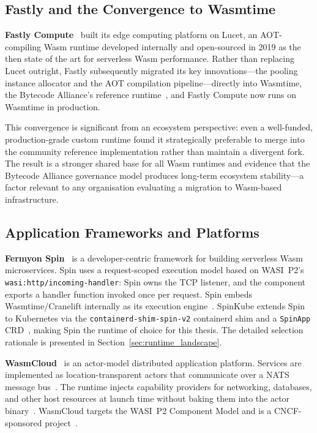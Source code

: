 \subsection{Fastly and the Convergence to Wasmtime}

\textbf{Fastly Compute}~\cite{fastly2024compute} built its edge computing platform on Lucet, an \acs{AOT}-compiling \acs{Wasm} runtime developed internally and open-sourced in 2019 as the then state of the art for serverless \acs{Wasm} performance. Rather than replacing Lucet outright, Fastly subsequently migrated its key innovations---the pooling instance allocator and the \acs{AOT} compilation pipeline---directly into Wasmtime, the Bytecode Alliance's reference runtime~\cite{fastly2020lucetwasm}, and Fastly Compute now runs on Wasmtime in production.

This convergence is significant from an ecosystem perspective: even a well-funded, production-grade custom runtime found it strategically preferable to merge into the community reference implementation rather than maintain a divergent fork. The result is a stronger shared base for all \acs{Wasm} runtimes and evidence that the Bytecode Alliance governance model produces long-term ecosystem stability---a factor relevant to any organisation evaluating a migration to \acs{Wasm}-based infrastructure.

\subsection{Application Frameworks and Platforms}

\begin{sloppypar}
\textbf{Fermyon Spin}~\cite{fermyon2024spin} is a developer-centric framework for building serverless \acs{Wasm} microservices. Spin uses a request-scoped execution model based on \acs{WASI}~P2's \texttt{wasi:http/incoming-handler}: Spin owns the TCP listener, and the component exports a handler function invoked once per request. Spin embeds Wasmtime/Cranelift internally as its execution engine~\cite{fermyon2024spin, bytecodealliance2024wasmtime}. SpinKube extends Spin to Kubernetes via the \texttt{containerd-shim-spin-v2} containerd shim and a \texttt{SpinApp} \acs{CRD}~\cite{spinkube2024}, making Spin the runtime of choice for this thesis. The detailed selection rationale is presented in Section~\ref{sec:runtime_landscape}.
\end{sloppypar}

\textbf{WasmCloud}~\cite{wasmcloud2024} is an actor-model distributed application platform. Services are implemented as location-transparent actors that communicate over a \acs{NATS} message bus~\cite{wasmcloud2024}. The runtime injects capability providers for networking, databases, and other host resources at launch time without baking them into the actor binary~\cite{wasmcloud2024}. WasmCloud targets the \acs{WASI}~P2 Component Model and is a \acs{CNCF}-sponsored project~\cite{wasmcloud2024}.

